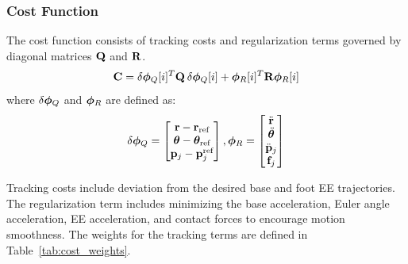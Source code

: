 \subsubsection{Cost Function}
The cost function consists of tracking costs and regularization terms governed by diagonal matrices $\mathbf{Q}$ and $\mathbf{R}$. 
\begin{equation}
    \mathbf{C} = \delta \bm{\phi}_Q[i]^T\mathbf{Q}\hspace{2pt}\delta \bm{\phi}_Q[i] + \bm{\phi}_R[i]^{T}\mathbf{R}\bm{\phi}_R[i]
\end{equation}
where $\delta \bm{\phi}_Q$ and $\bm{\phi}_R$ are defined as:
\begin{equation}
    \delta \bm{\phi}_Q = \begin{bmatrix}
        \mathbf{r} - \mathbf{r}_{\text{ref}}\\
        \bm{\theta} - \bm{\theta}_{\text{ref}}\\
        \mathbf{p}_j - \mathbf{p}_{j}^{\text{ref}}
    \end{bmatrix}, \bm{\phi}_R = \begin{bmatrix}
        \ddot{\mathbf{r}}\\
        \ddot{\bm{\theta}}\\
        \ddot{\mathbf{p}}_j\\
        \mathbf{f}_j
    \end{bmatrix}
\end{equation}

Tracking costs include deviation from the desired base and foot EE trajectories. The regularization term includes minimizing the base acceleration, Euler angle acceleration, EE acceleration, and contact forces to encourage motion smoothness. The weights for the tracking terms are defined in Table~\ref{tab:cost_weights}.



